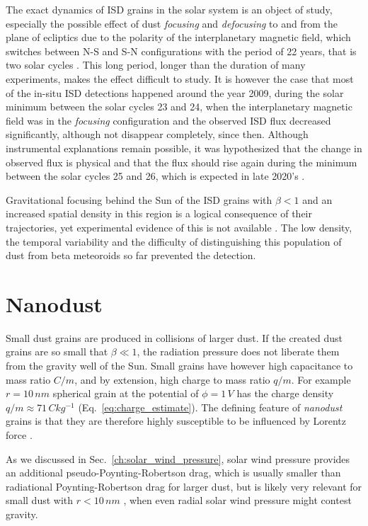 The exact dynamics of ISD grains in the solar system is an object of study, especially the possible effect of dust \textit{focusing} and \textit{defocusing} to and from the plane of ecliptics due to the polarity of the interplanetary magnetic field, which switches between N-S and S-N configurations with the period of 22 years, that is two solar cycles \citep{morfill1979motion}. This long period, longer than the duration of many experiments, makes the effect difficult to study. It is however the case that most of the in-situ ISD detections happened around the year 2009, during the solar minimum between the solar cycles 23 and 24, when the interplanetary magnetic field was in the \textit{focusing} configuration \citep{babic2022situ} and the observed ISD flux decreased significantly, although not disappear completely, since then. Although instrumental explanations remain possible, it was hypothesized that the change in observed flux is physical and that the flux should rise again during the minimum between the solar cycles 25 and 26, which is expected in late 2020's \citep{mann2010interstellar}. 

Gravitational focusing behind the Sun of the ISD grains with $\beta < 1$ and an increased spatial density in this region is a logical consequence of their trajectories, yet experimental evidence of this is not available \citep{mann2010interstellar}. The low density, the temporal variability and the difficulty of distinguishing this population of dust from beta meteoroids so far prevented the detection.

\section{Nanodust}

Small dust grains are produced in collisions of larger dust. If the created dust grains are so small that $\beta \ll 1$, the radiation pressure does not liberate them from the gravity well of the Sun. Small grains have however high capacitance to mass ratio $C/m$, and by extension, high charge to mass ratio $q/m$. For example $r = 10 \, \si{nm}$ spherical grain at the potential of $\phi = 1 \, \si{V}$ has the charge density $q/m \approx 71 \, \si{Ckg^{-1}}$ (Eq.~\ref{eq:charge_estimate}). The defining feature of \textit{nanodust} grains is that they are therefore highly susceptible to be influenced by Lorentz force \citep{czechowski2010formation}. 

As we discussed in Sec.~\ref{ch:solar_wind_pressure}, solar wind pressure provides an additional pseudo-Poynting-Robertson drag, which is usually smaller than radiational Poynting-Robertson drag for larger dust, but is likely very relevant for small dust with $r<10\, \si{nm}$ \citep{mukai1982solar}, when even radial solar wind pressure might contest gravity. 

